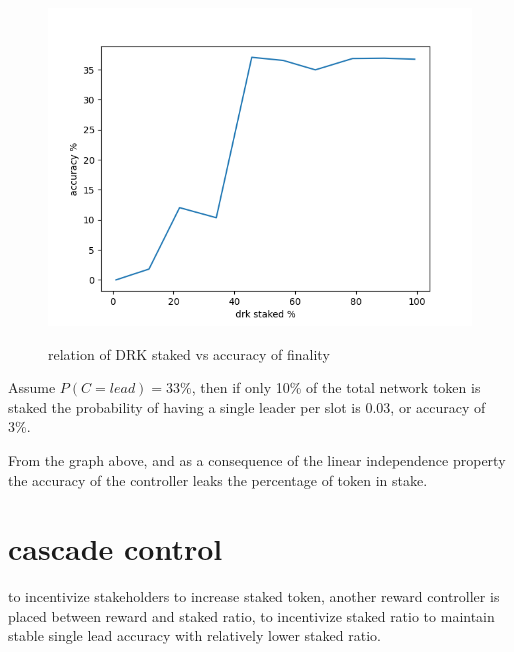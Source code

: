 \documentclass{article}
\begin{document}
\begin{description}
  \begin{figure}[!h]
    \caption {relation of DRK staked vs accuracy of finality}
    \centering
    \includegraphics{hodler_acc_vs_sr.png}
    \label{fig:relation of DRK staked vs accuracy of finality}
    \end{figure}


\item Assume $P(C=lead)=33\%$, then if only 10\% of the total network token
is staked the probability of having a single leader per slot is 0.03,
or accuracy of 3\%.


\item From the graph above, and as a consequence of the linear independence
property the accuracy of the controller leaks the percentage of token
in stake.

\end{description}

\section{cascade control}
\begin{description}
\item to incentivize stakeholders to increase staked token, another reward controller is placed between reward and staked ratio, to incentivize staked ratio to maintain stable single lead accuracy with relatively lower staked ratio.

\end{description}
\end{document}
